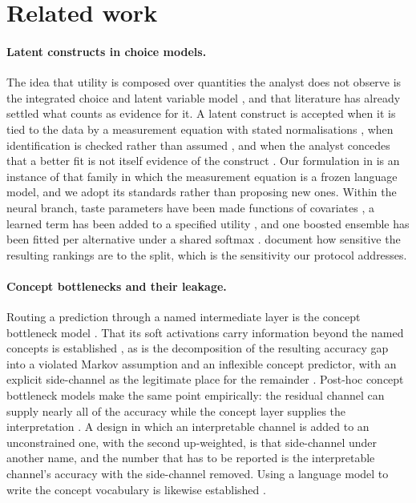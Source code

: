 \section{Related work}

\paragraph{Latent constructs in choice models.} The idea that utility is composed over
quantities the analyst does not observe is the integrated choice and latent variable model
\citep{benakiva2002hybrid,walker2002grum}, and that literature has already settled what
counts as evidence for it. A latent construct is accepted when it is tied to the data by a
measurement equation with stated normalisations \citep{daly2012ordered}, when identification
is checked rather than assumed \citep{raveau2012identifiability}, and when the analyst
concedes that a better fit is not itself evidence of the construct
\citep{vij2016latently,chorus2014impossibility}. Our formulation in  is an
instance of that family in which the measurement equation is a frozen language model, and we
adopt its standards rather than proposing new ones. Within the neural branch, taste
parameters have been made functions of covariates \citep{han2022tastenet}, a learned term has
been added to a specified utility \citep{sifringer2020enhancing}, and one boosted ensemble has
been fitted per alternative under a shared softmax \citep{salvade2024rumboost}.
\citet{hillel2021systematic} document how sensitive the resulting rankings are to the split,
which is the sensitivity our protocol addresses.

\paragraph{Concept bottlenecks and their leakage.} Routing a prediction through a named
intermediate layer is the concept bottleneck model \citep{koh2020concept}. That its soft
activations carry information beyond the named concepts is established
\citep{mahinpei2021promises}, as is the decomposition of the resulting accuracy gap into a
violated Markov assumption and an inflexible concept predictor, with an explicit side-channel
as the legitimate place for the remainder \citep{havasi2022addressing}. Post-hoc concept
bottleneck models make the same point empirically: the residual channel can supply nearly all
of the accuracy while the concept layer supplies the interpretation \citep{yuksekgonul2023post}.
A design in which an interpretable channel is added to an unconstrained one, with the second
up-weighted, is that side-channel under another name, and the number that has to be reported
is the interpretable channel's accuracy with the side-channel removed. Using a language model
to write the concept vocabulary is likewise established \citep{oikarinen2023labelfree,yang2023labo}.

